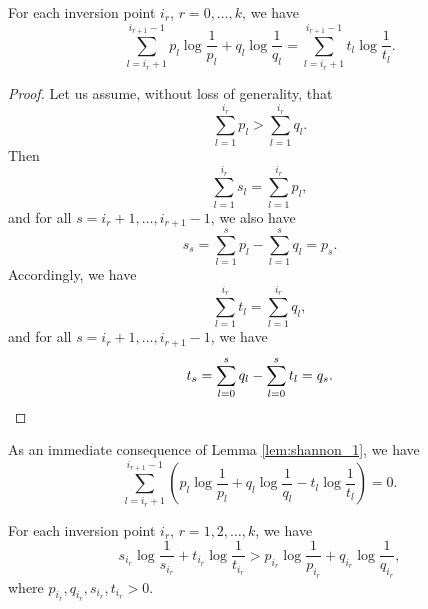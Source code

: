 \begin{appendix_lemma} \label{lem:shannon_1}
    For each inversion point $i_r$, $r = 0, \ldots, k$, we have
    \begin{equation}
        \sum_{l=i_r+1}^{i_{r+1}-1} p_l \log \frac{1}{p_l} + q_l \log \frac{1}{q_l} = \sum_{l=i_r+1}^{i_{r+1}-1} t_l \log \frac{1}{t_l}.
    \end{equation}
\end{appendix_lemma} 

\begin{proof} Let us assume, without loss of generality, that
    \begin{equation}
        \sum_{l=1}^{i_r} p_l > \sum_{l=1}^{i_r} q_l.
    \end{equation}
    Then
    \begin{equation}
        \sum_{l=1}^{i_r} s_l = \sum_{l=1}^{i_r} p_l,
    \end{equation}
    and for all $s = i_r + 1, \ldots, i_{r+1} - 1$, we also have
    \begin{equation}
        s_s = \sum_{l=1}^{s} p_l - \sum_{l=1}^{s} q_l = p_s.
    \end{equation}
    Accordingly, we have
    \begin{equation}
        \sum_{l=1}^{i_r} t_l = \sum_{l=1}^{i_r} q_l,
    \end{equation}
    and for all $s = i_r + 1, \ldots, i_{r+1} - 1$, we have
    \begin{equation}
        t_s = \sum_{l=0}^{s} q_l - \sum_{l=0}^{s} t_l = q_s. \qedhere
    \end{equation}
\end{proof}

As an immediate consequence of Lemma \ref{lem:shannon_1}, we have
\begin{equation}
    \sum_{l=i_r+1}^{i_{r+1}-1} \left( p_l \log \frac{1}{p_l} + q_l \log \frac{1}{q_l} - t_l \log \frac{1}{t_l} \right) = 0.
\end{equation}

\begin{appendix_lemma} \label{lem:shannon_2}
    For each inversion point $i_r$, $r = 1, 2, \ldots, k$, we have
    \begin{equation}
        s_{i_r} \log \frac{1}{s_{i_r}} + t_{i_r} \log \frac{1}{t_{i_r}} > p_{i_r} \log \frac{1}{p_{i_r}} + q_{i_r} \log \frac{1}{q_{i_r}},
    \end{equation}
    where $p_{i_r}, q_{i_r}, s_{i_r}, t_{i_r} > 0$.
\end{appendix_lemma}

